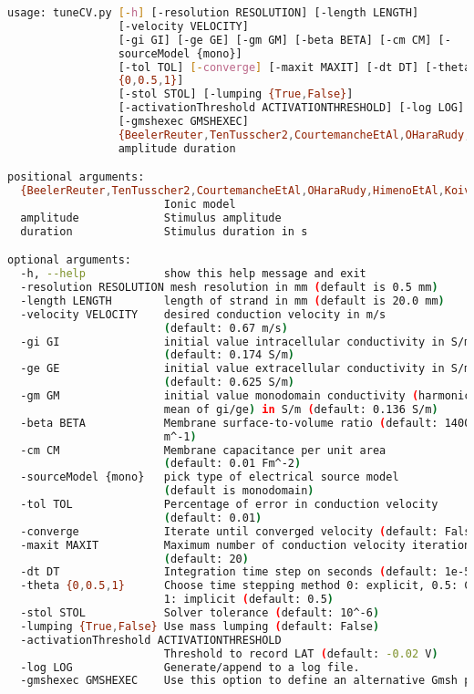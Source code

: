 \begin{lstlisting}[language=bash,caption=Syntax for tuneCV.py]
usage: tuneCV.py [-h] [-resolution RESOLUTION] [-length LENGTH] 
                 [-velocity VELOCITY]
                 [-gi GI] [-ge GE] [-gm GM] [-beta BETA] [-cm CM] [-
                 sourceModel {mono}]
                 [-tol TOL] [-converge] [-maxit MAXIT] [-dt DT] [-theta 
                 {0,0.5,1}]
                 [-stol STOL] [-lumping {True,False}]
                 [-activationThreshold ACTIVATIONTHRESHOLD] [-log LOG]
                 [-gmshexec GMSHEXEC]
                 {BeelerReuter,TenTusscher2,CourtemancheEtAl,OHaraRudy,HimenoEtAl,KoivumaekiEtAl,GrandiEtAlVentricle,GrandiEtAlAtrium}
                 amplitude duration

positional arguments:
  {BeelerReuter,TenTusscher2,CourtemancheEtAl,OHaraRudy,HimenoEtAl,KoivumaekiEtAl,GrandiEtAlVentricle,GrandiEtAlAtrium}
                        Ionic model
  amplitude             Stimulus amplitude
  duration              Stimulus duration in s

optional arguments:
  -h, --help            show this help message and exit
  -resolution RESOLUTION mesh resolution in mm (default is 0.5 mm)
  -length LENGTH        length of strand in mm (default is 20.0 mm)
  -velocity VELOCITY    desired conduction velocity in m/s 
                        (default: 0.67 m/s)
  -gi GI                initial value intracellular conductivity in S/m 
                        (default: 0.174 S/m)
  -ge GE                initial value extracellular conductivity in S/m 
                        (default: 0.625 S/m)
  -gm GM                initial value monodomain conductivity (harmonic 
                        mean of gi/ge) in S/m (default: 0.136 S/m)
  -beta BETA            Membrane surface-to-volume ratio (default: 140000 
                        m^-1)
  -cm CM                Membrane capacitance per unit area 
                        (default: 0.01 Fm^-2)
  -sourceModel {mono}   pick type of electrical source model 
                        (default is monodomain)
  -tol TOL              Percentage of error in conduction velocity 
                        (default: 0.01)
  -converge             Iterate until converged velocity (default: False)
  -maxit MAXIT          Maximum number of conduction velocity iterations 
                        (default: 20)
  -dt DT                Integration time step on seconds (default: 1e-5 s)
  -theta {0,0.5,1}      Choose time stepping method 0: explicit, 0.5: CN, 
                        1: implicit (default: 0.5)
  -stol STOL            Solver tolerance (default: 10^-6)
  -lumping {True,False} Use mass lumping (default: False)
  -activationThreshold ACTIVATIONTHRESHOLD
                        Threshold to record LAT (default: -0.02 V)
  -log LOG              Generate/append to a log file.
  -gmshexec GMSHEXEC    Use this option to define an alternative Gmsh path.
\end{lstlisting}


